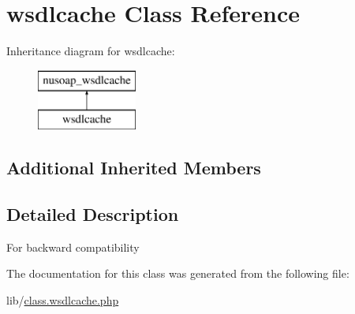 \hypertarget{classwsdlcache}{}\section{wsdlcache Class Reference}
\label{classwsdlcache}
Inheritance diagram for wsdlcache\+:\begin{figure}[H]
\begin{center}
\leavevmode
\includegraphics[height=2.000000cm]{classwsdlcache}
\end{center}
\end{figure}
\subsection*{Additional Inherited Members}


\subsection{Detailed Description}
For backward compatibility 

The documentation for this class was generated from the following file\+:\begin{DoxyCompactItemize}
\item 
lib/\hyperlink{class_8wsdlcache_8php}{class.\+wsdlcache.\+php}\end{DoxyCompactItemize}
